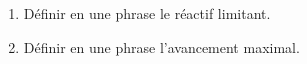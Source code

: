 \begin{enumerate}
    \item Définir en une phrase le réactif limitant.
    \item Définir en une phrase l'avancement maximal.
\end{enumerate}

